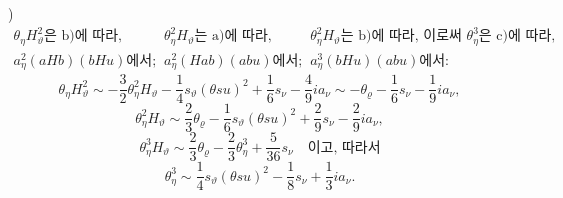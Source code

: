 
)
\[
\begin{array}{ccc}
\theta_\eta H_\vartheta^2\text{은 b)에 따라},&
\theta_\eta^2H_\vartheta\text{는 a)에 따라},&
\theta_\eta^2H_\vartheta\text{는 b)에 따라, 이로써 }\theta_\eta^3\text{은 c)에 따라},\\
a_\eta^2(aHb)(bHu)\text{에서};&
a_\eta^2(Hab)(abu)\text{에서};&
a_\eta^3(bHu)(abu)\text{에서}:
\end{array}
\]
\[
\theta_\eta H_\vartheta^2\sim-\frac32\theta_\eta^2H_\vartheta-\frac14s_\vartheta(\theta su)^2+\frac16s_\nu-\frac49ia_\nu
\sim-\theta_\varrho-\frac16s_\nu-\frac19ia_\nu,
\]
\[
\theta_\eta^2H_\vartheta\sim\frac23\theta_\varrho-\frac16s_\vartheta(\theta su)^2+\frac29s_\nu-\frac29ia_\nu,
\]
\[
\theta_\eta^3H_\vartheta\sim\frac23\theta_\varrho-\frac23\theta_\eta^3+\frac5{36}s_\nu\quad\text{이고, 따라서}
\]
\[
\theta_\eta^3\sim\frac14s_\vartheta(\theta su)^2-\frac18s_\nu+\frac13ia_\nu.
\]
